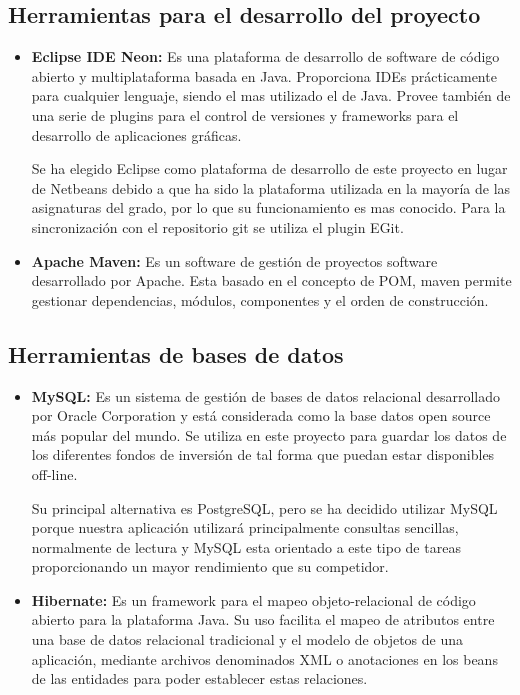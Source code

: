 \documentclass[12pt, a4paper]{article}
\begin{document}
\subsection{Herramientas para el desarrollo del proyecto}

\begin{itemize}
	\item \textbf{Eclipse IDE Neon: } Es una plataforma de desarrollo de software de código abierto y multiplataforma basada en Java. Proporciona \glspl{IDE} prácticamente para cualquier lenguaje, siendo el mas utilizado el de Java. Provee también de una serie de plugins para el control de versiones y frameworks para el desarrollo de aplicaciones gráficas.
	
	\vspace{2mm}
	
	Se ha elegido Eclipse como plataforma de desarrollo de este proyecto en lugar de Netbeans debido a que ha sido la plataforma utilizada en la mayoría de las asignaturas del grado, por lo que su funcionamiento es mas conocido. Para la sincronización con el repositorio git se utiliza el plugin EGit.\\
	
	\item \textbf{Apache Maven: }Es un software de gestión de proyectos software desarrollado por Apache. Esta basado en el concepto de \gls{POM}, maven permite gestionar dependencias, módulos, componentes y el orden de construcción.
	
\end{itemize}

\newpage

\subsection{Herramientas de bases de datos}

\begin{itemize}
	\item \textbf{MySQL: }Es un sistema de gestión de bases de datos relacional desarrollado por Oracle Corporation y está considerada como la base datos open source más popular del mundo. Se utiliza en este proyecto para guardar los datos de los diferentes fondos de inversión de tal forma que puedan estar disponibles off-line.
	
	\vspace{2mm}
	
	Su principal alternativa es PostgreSQL, pero se ha decidido utilizar MySQL porque nuestra aplicación utilizará principalmente consultas sencillas, normalmente de lectura y MySQL esta orientado a este tipo de tareas proporcionando un mayor rendimiento que su competidor.\\  
	
	\item \textbf{Hibernate: }Es un framework para el mapeo objeto-relacional de código abierto para la plataforma Java. Su uso facilita el mapeo de atributos entre una base de datos relacional tradicional y el modelo de objetos de una aplicación, mediante archivos denominados \gls{XML} o anotaciones en los beans de las entidades para poder establecer estas relaciones.
\end{itemize}	
\end{document}
